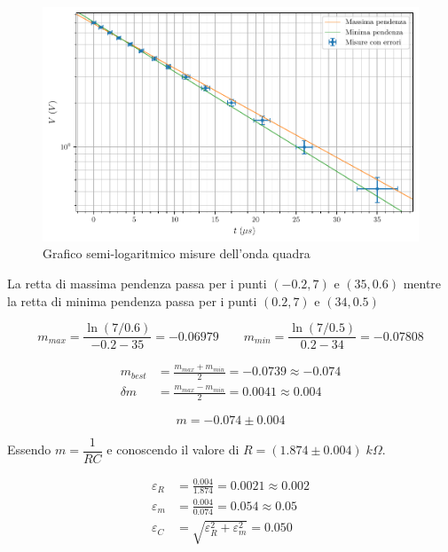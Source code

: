\documentclass[11pt, a4paper]{article}
\numberwithin{equation}{section} %
\begin{document}
\begin{figure}[ht!]
    \includegraphics{onda_quadra_V(t)_pendenze.pdf}
    \caption{Grafico semi-logaritmico misure dell'onda quadra}
    \label{fig:onda quadra pendenze}
\end{figure}

La retta di massima pendenza passa per i punti \((-0.2, 7)\) e \((35, 0.6)\) mentre la retta di minima pendenza passa per i punti \((0.2, 7)\) e \((34, 0.5)\)

\begin{equation*}
    m_{max} = \frac{\ln(7/0.6)}{- 0.2 - 35} = - 0.06979
    \qquad
    m_{min} = \frac{\ln(7/0.5)}{0.2 - 34} = - 0.07808
\end{equation*}

\begin{align*}
    m_{best} &= \frac{m_{max} + m_{min}}{2} = - 0.0739 \approx - 0.074 \\
    \delta m &= \frac{m_{max} - m_{min}}{2} = 0.0041 \approx 0.004
\end{align*}

\begin{equation}
    m = - 0.074 \pm 0.004
\end{equation}

Essendo \(m = \dfrac{1}{RC}\) e conoscendo il valore di \(R = (1.874 \pm 0.004) \; \unit{k\Omega}\).

\begin{align*}
    \varepsilon_R &= \frac{0.004}{1.874} = 0.0021 \approx 0.002 \\
    \varepsilon_m &= \frac{0.004}{0.074} = 0.054 \approx 0.05 \\
    \varepsilon_C &= \sqrt{\varepsilon_R^{2} + \varepsilon_m^{2}} = 0.050 %
\end{align*}
\end{document}
